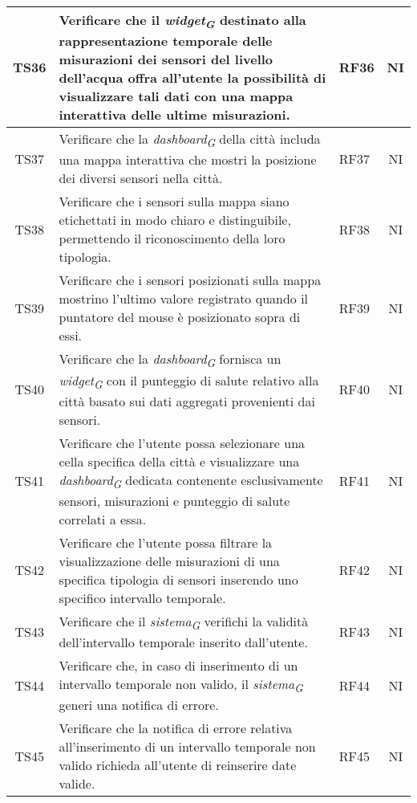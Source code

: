 \begin{longtable}{|c|p{5cm}|>{\raggedright}p{2cm}|c|}
        \hline
        TS36 & Verificare che il \textit{widget}\textsubscript{\textit{G}} destinato alla rappresentazione temporale delle misurazioni dei sensori del livello dell'acqua offra all'utente la possibilità di visualizzare tali dati con una mappa interattiva delle ultime misurazioni. & RF36 & NI \\
        \hline
        TS37 & Verificare che la \textit{dashboard}\textsubscript{\textit{G}} della città includa una mappa interattiva che mostri la posizione dei diversi sensori nella città. & RF37 & NI \\
        \hline
        TS38 & Verificare che i sensori sulla mappa siano etichettati in modo chiaro e distinguibile, permettendo il riconoscimento della loro tipologia. & RF38 & NI \\
        \hline
        TS39 & Verificare che i sensori posizionati sulla mappa mostrino l'ultimo valore registrato quando il puntatore del mouse è posizionato sopra di essi. & RF39 & NI \\
        \hline
        TS40 & Verificare che la \textit{dashboard}\textsubscript{\textit{G}} fornisca un \textit{widget}\textsubscript{\textit{G}} con il punteggio di salute relativo alla città basato sui dati aggregati provenienti dai sensori. & RF40 & NI \\
        \hline
        TS41 & Verificare che l'utente possa selezionare una cella specifica della città e visualizzare una \textit{dashboard}\textsubscript{\textit{G}} dedicata contenente esclusivamente sensori, misurazioni e punteggio di salute correlati a essa. & RF41 & NI \\
        \hline
        TS42 & Verificare che l'utente possa filtrare la visualizzazione delle misurazioni di una specifica tipologia di sensori inserendo uno specifico intervallo temporale. & RF42 & NI \\
        \hline
        TS43 & Verificare che il \textit{sistema}\textsubscript{\textit{G}} verifichi la validità dell'intervallo temporale inserito dall'utente. & RF43 & NI \\
        \hline
        TS44 & Verificare che, in caso di inserimento di un intervallo temporale non valido, il \textit{sistema}\textsubscript{\textit{G}} generi una notifica di errore. & RF44 & NI \\
        \hline
        TS45 & Verificare che la notifica di errore relativa all'inserimento di un intervallo temporale non valido richieda all'utente di reinserire date valide. & RF45 & NI \\

\end{longtable}
